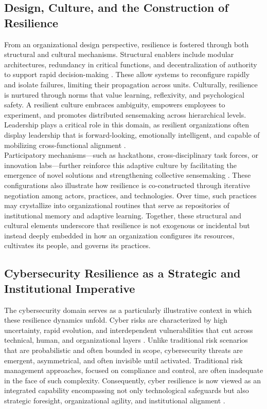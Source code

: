 \subsection{Design, Culture, and the Construction of Resilience}
From an organizational design perspective, resilience is fostered through both structural and cultural mechanisms. Structural enablers include modular architectures, redundancy in critical functions, and decentralization of authority to support rapid decision-making \autocite{lengnick2011developing}. These allow systems to reconfigure rapidly and isolate failures, limiting their propagation across units. Culturally, resilience is nurtured through norms that value learning, reflexivity, and psychological safety. A resilient culture embraces ambiguity, empowers employees to experiment, and promotes distributed sensemaking across hierarchical levels. Leadership plays a critical role in this domain, as resilient organizations often display leadership that is forward-looking, emotionally intelligent, and capable of mobilizing cross-functional alignment \autocite{gillard2023efficient}.\\

Participatory mechanisms—such as hackathons, cross-disciplinary task forces, or innovation labs—further reinforce this adaptive culture by facilitating the emergence of novel solutions and strengthening collective sensemaking \autocite{maillart2024computational}. These configurations also illustrate how resilience is co-constructed through iterative negotiation among actors, practices, and technologies. Over time, such practices may crystallize into organizational routines that serve as repositories of institutional memory and adaptive learning. Together, these structural and cultural elements underscore that resilience is not exogenous or incidental but instead deeply embedded in how an organization configures its resources, cultivates its people, and governs its practices.

\subsection{Cybersecurity Resilience as a Strategic and Institutional Imperative}

The cybersecurity domain serves as a particularly illustrative context in which these resilience dynamics unfold. Cyber risks are characterized by high uncertainty, rapid evolution, and interdependent vulnerabilities that cut across technical, human, and organizational layers \autocite{linkov2013resilience}. Unlike traditional risk scenarios that are probabilistic and often bounded in scope, cybersecurity threats are emergent, asymmetrical, and often invisible until activated. Traditional risk management approaches, focused on compliance and control, are often inadequate in the face of such complexity. Consequently, cyber resilience is now viewed as an integrated capability encompassing not only technological safeguards but also strategic foresight, organizational agility, and institutional alignment \autocite{bjorck2015cyber, lostri2022shared}.\\

